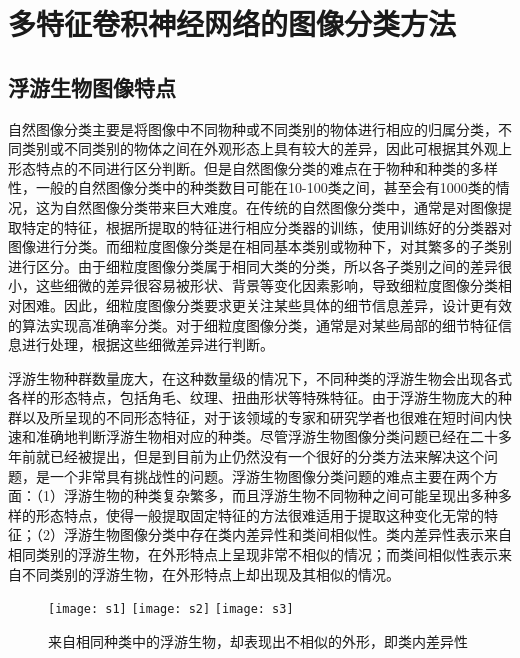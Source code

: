 \chapter{多特征卷积神经网络的图像分类方法}


\section{浮游生物图像特点}
自然图像分类主要是将图像中不同物种或不同类别的物体进行相应的归属分类，不同类别或不同类别的物体之间在外观形态上具有较大的差异，因此可根据其外观上形态特点的不同进行区分判断。但是自然图像分类的难点在于物种和种类的多样性，一般的自然图像分类中的种类数目可能在10-100类之间，甚至会有1000类的情况，这为自然图像分类带来巨大难度。在传统的自然图像分类中，通常是对图像提取特定的特征，根据所提取的特征进行相应分类器的训练，使用训练好的分类器对图像进行分类。而细粒度图像分类是在相同基本类别或物种下，对其繁多的子类别进行区分。由于细粒度图像分类属于相同大类的分类，所以各子类别之间的差异很小，这些细微的差异很容易被形状、背景等变化因素影响，导致细粒度图像分类相对困难。因此，细粒度图像分类要求更关注某些具体的细节信息差异，设计更有效的算法实现高准确率分类。对于细粒度图像分类，通常是对某些局部的细节特征信息进行处理，根据这些细微差异进行判断。

浮游生物种群数量庞大，在这种数量级的情况下，不同种类的浮游生物会出现各式各样的形态特点，包括角毛、纹理、扭曲形状等特殊特征。由于浮游生物庞大的种群以及所呈现的不同形态特征，对于该领域的专家和研究学者也很难在短时间内快速和准确地判断浮游生物相对应的种类。尽管浮游生物图像分类问题已经在二十多年前就已经被提出，但是到目前为止仍然没有一个很好的分类方法来解决这个问题，是一个非常具有挑战性的问题。浮游生物图像分类问题的难点主要在两个方面：（1）浮游生物的种类复杂繁多，而且浮游生物不同物种之间可能呈现出多种多样的形态特点，使得一般提取固定特征的方法很难适用于提取这种变化无常的特征；（2）浮游生物图像分类中存在类内差异性和类间相似性。类内差异性表示来自相同类别的浮游生物，在外形特点上呈现非常不相似的情况；而类间相似性表示来自不同类别的浮游生物，在外形特点上却出现及其相似的情况。

\begin{figure}[H]
  \centering%
  \subcaptionbox{} %
    {\texttt{[image: s1]}}%
  \hspace{2em}%
  \subcaptionbox{}
      {\texttt{[image: s2]}}
  \hspace{2em}%
  \subcaptionbox{}
      {\texttt{[image: s3]}}
  \caption{来自相同种类中的浮游生物，却表现出不相似的外形，即类内差异性}
\end{figure}

